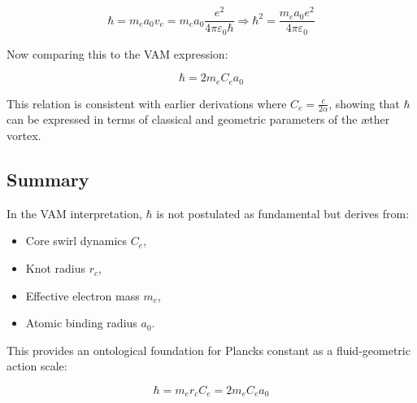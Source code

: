 \begin{equation}
    \hbar = m_e a_0 v_e = m_e a_0 \frac{e^2}{4\pi \varepsilon_0 \hbar} \Rightarrow \hbar^2 = \frac{m_e a_0 e^2}{4\pi \varepsilon_0}
\end{equation}

Now comparing this to the VAM expression:

\begin{equation}
    \boxed{\hbar = 2 m_e C_e a_0}
\end{equation}

This relation is consistent with earlier derivations where \( C_e = \frac{c}{2\alpha} \), showing that \( \hbar \) can be expressed in terms of classical and geometric parameters of the æther vortex.

\subsection*{Summary}

In the VAM interpretation, \( \hbar \) is not postulated as fundamental but derives from:

\begin{itemize}
    \item Core swirl dynamics \( C_e \),
    \item Knot radius \( r_c \),
    \item Effective electron mass \( m_e \),
    \item Atomic binding radius \( a_0 \).
\end{itemize}

This provides an ontological foundation for Planck\rqs s constant as a fluid-geometric action scale:

\begin{equation}
    \boxed{\hbar = m_e r_c C_e = 2 m_e C_e a_0}
\end{equation}
